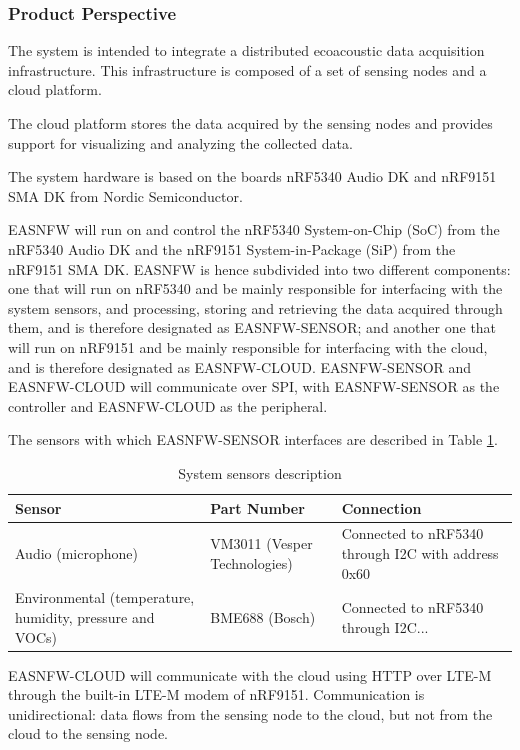 \documentclass[11pt,a4paper]{article}
\begin{document}
\subsubsection{Product Perspective}

The system is intended to integrate a distributed ecoacoustic data acquisition
infrastructure. This infrastructure is composed of a set of sensing nodes and a
cloud platform.

The cloud platform stores the data acquired by the sensing nodes and provides
support for visualizing and analyzing the collected data.

The system hardware is based on the boards nRF5340 Audio DK and nRF9151 SMA DK
from Nordic Semiconductor.

EASNFW will run on and control the nRF5340 System-on-Chip (SoC) from the
nRF5340 Audio DK and the nRF9151 System-in-Package (SiP) from the nRF9151 SMA
DK. EASNFW is hence subdivided into two different components: one that will run
on nRF5340 and be mainly responsible for interfacing with the system sensors,
and processing, storing and retrieving the data acquired through them, and is
therefore designated as EASNFW-SENSOR; and another one that will run on nRF9151
and be mainly responsible for interfacing with the cloud, and is therefore
designated as EASNFW-CLOUD. EASNFW-SENSOR and EASNFW-CLOUD will communicate
over SPI, with EASNFW-SENSOR as the controller and EASNFW-CLOUD as the
peripheral.

The sensors with which EASNFW-SENSOR interfaces are described in Table
\ref{table:sensors}.

\begin{table}[h!]
\centering
\begin{tabular}{ m{4cm} m{3.5cm} m{6cm} }
    Sensor                                                   & Part Number                  & Connection \\
    \hline
    Audio (microphone)                                       & VM3011 (Vesper Technologies) & Connected to nRF5340 through I2C with address 0x60 \\
    Environmental (temperature, humidity, pressure and VOCs) & BME688 (Bosch)               & Connected to nRF5340 through I2C...
\end{tabular}
\caption{System sensors description}\label{table:sensors}
\end{table}

EASNFW-CLOUD will communicate with the cloud using HTTP over LTE-M through the
built-in LTE-M modem of nRF9151. Communication is unidirectional: data flows
from the sensing node to the cloud, but not from the cloud to the sensing node.
\end{document}
